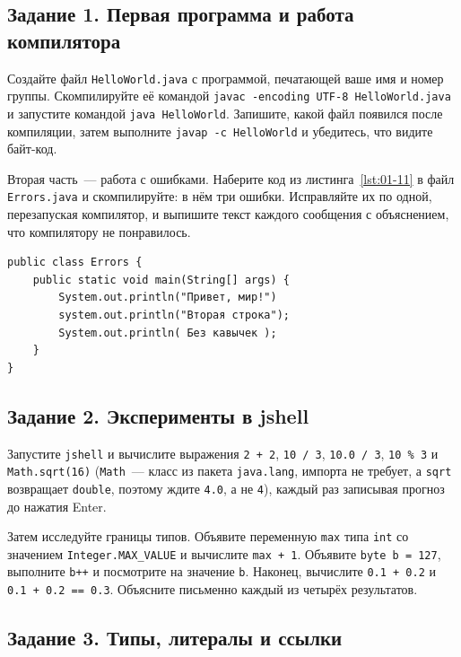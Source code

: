 \subsection*{Задание 1. Первая программа и работа компилятора}

Создайте файл \texttt{HelloWorld.java} с программой, печатающей ваше имя и номер
группы. Скомпилируйте её командой
\texttt{javac~-encoding UTF-8 HelloWorld.java} и запустите командой
\texttt{java HelloWorld}. Запишите, какой файл появился после компиляции, затем
выполните \texttt{javap -c HelloWorld} и убедитесь, что видите байт-код.

Вторая часть~--- работа с ошибками. Наберите код из листинга~\ref{lst:01-11} в
файл \texttt{Errors.java} и скомпилируйте: в нём три ошибки. Исправляйте их по
одной, перезапуская компилятор, и выпишите текст каждого сообщения с
объяснением, что компилятору не понравилось.

\begin{listing}[H]
\begin{verbatim}
public class Errors {
    public static void main(String[] args) {
        System.out.println("Привет, мир!")
        system.out.println("Вторая строка");
        System.out.println( Без кавычек );
    }
}
\end{verbatim}
\caption{Код с тремя ошибками для задания 1}
\label{lst:01-11}
\end{listing}

\subsection*{Задание 2. Эксперименты в jshell}

Запустите \texttt{jshell} и вычислите выражения \texttt{2 + 2},
\texttt{10 / 3}, \texttt{10.0 / 3}, \texttt{10 \% 3} и \texttt{Math.sqrt(16)}
(\texttt{Math}~--- класс из пакета \texttt{java.lang}, импорта не требует, а
\texttt{sqrt} возвращает \texttt{double}, поэтому ждите \texttt{4.0}, а не
\texttt{4}), каждый раз записывая прогноз до нажатия Enter.

Затем исследуйте границы типов. Объявите переменную \texttt{max} типа
\texttt{int} со значением \texttt{Integer.MAX\_VALUE} и вычислите
\texttt{max + 1}. Объявите \texttt{byte b = 127}, выполните \texttt{b++} и
посмотрите на значение \texttt{b}. Наконец, вычислите \texttt{0.1 + 0.2} и
\texttt{0.1 + 0.2 == 0.3}. Объясните письменно каждый из четырёх результатов.

\subsection*{Задание 3. Типы, литералы и ссылки}

